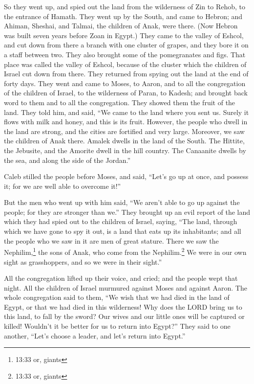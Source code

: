 \myverse{}So they went up, and spied out the land from the wilderness
of Zin to Rehob, to the entrance of Hamath.
\myverse{}They went up by the South, and came to Hebron; and Ahiman, Sheshai, and Talmai,
the children of Anak, were there. (Now Hebron was built seven years before Zoan in Egypt.)
\myverse{}They came to the valley of Eshcol, and cut down from there a branch with
one cluster of grapes, and they bore it on a staff between two. They also brought some of the pomegranates
and figs.
\myverse{}That place was called the valley of Eshcol, because of the cluster which
the children of Israel cut down from there.
\myverse{}They returned from spying out the land at the end of forty days.
\myverse{}They went and came to Moses, to Aaron, and to all the congregation of the
children of Israel, to the wilderness of Paran, to Kadesh; and brought back word to them and to all the
congregation. They showed them the fruit of the land.
\myverse{}They told him, and said, “We came to the land where you sent us. Surely it
flows with milk and honey, and this is its fruit.
\myverse{}However, the people who dwell in the land are strong, and the cities are
fortified and very large. Moreover, we saw the children of Anak there.
\myverse{}Amalek dwells in the land of the South. The Hittite, the Jebusite, and the
Amorite dwell in the hill country. The Canaanite dwells by the sea, and along the side of the Jordan.”


\myverse{}Caleb stilled the people before Moses, and said, “Let’s go up
at once, and possess it; for we are well able to overcome it!”


\myverse{}But the men who went up with him said, “We aren’t able to go
up against the people; for they are stronger than we.”
\myverse{}They brought up an evil report of the land which they had spied out to the
children of Israel, saying, “The land, through which we have gone to spy it out, is a land that eats up
its inhabitants; and all the people who we saw in it are men of great stature.
\myverse{}There we saw the Nephilim,\footnote{ 13:33 or, giants} the sons of Anak, who come from the Nephilim.\footnote{ 13:33 or, giants} We were in our own sight as grasshoppers, and so we were in their sight.”


\mychapter{} \myverse*{}All the congregation lifted up their voice, and cried; and the
people wept that night.
\myverse{}All the children of Israel murmured against Moses and against Aaron. The whole
congregation said to them, “We wish that we had died in the land of Egypt, or that we had died in this
wilderness!
\myverse{}Why does the LORD bring us to this land, to fall by the sword? Our wives and
our little ones will be captured or killed! Wouldn’t it be better for us to return into Egypt?”
\myverse{}They said to one another, “Let’s choose a leader, and let’s return into Egypt.”


